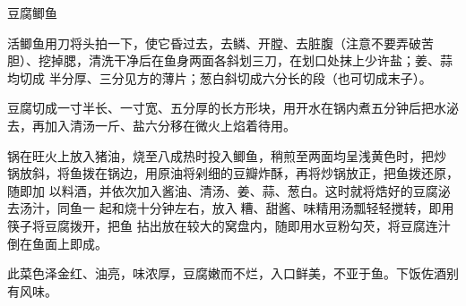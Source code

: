 %
%
%
%
%
%
%
\begin{recipe}{豆腐鲫鱼}

\ingredients


\preparation

\step 活鲫鱼用刀将头拍一下，使它昏过去，去鳞、开膛、去脏腹（注意不要弄破苦
胆）、挖掉腮，清洗干净后在鱼身两面各斜划三刀，在划口处抹上少许盐；姜、蒜均切成
半分厚、三分见方的薄片；葱白斜切成六分长的段（也可切成末子）。

\step 豆腐切成一寸半长、一寸宽、五分厚的长方形块，用开水在锅内煮五分钟后把水泌
去，再加入清汤一斤、盐六分移在微火上焰着待用。

\step 锅在旺火上放入猪油，烧至八成热时投入鲫鱼，稍煎至两面均呈浅黄色时，把炒
锅放斜，将鱼拨在锅边，用原油将剁细的豆瓣炸酥，再将炒锅放正，把鱼拨还原，随即加
以料酒，并依次加入酱油、清汤、姜、蒜、葱白。这时就将焅好的豆腐泌去汤汁，同鱼一
起和烧十分钟左右，放入𰪿糟、甜酱、味精用汤瓢轻轻搅转，即用筷子将豆腐拨开，把鱼
拈出放在较大的窝盘内，随即用水豆粉勾芡，将豆腐连汁倒在鱼面上即成。

\features

此菜色泽金红、油亮，味浓厚，豆腐嫩而不烂，入口鲜美，不亚于鱼。下饭佐酒别有风味。

\end{recipe}

